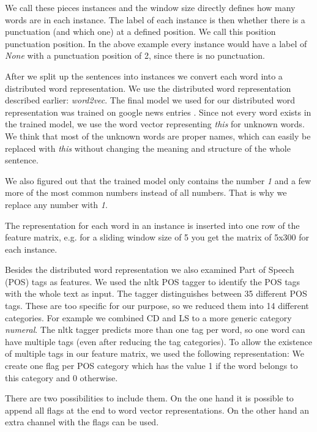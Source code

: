 We call these pieces instances and the window size directly defines how many words are in each instance.
The label of each instance is then whether there is a punctuation (and which one) at a defined position.
We call this position punctuation position.
In the above example every instance would have a label of \emph{None} with a punctuation position of 2, since there is no punctuation.

After we split up the sentences into instances we convert each word into a distributed word representation.
We use the distributed word representation described earlier: \emph{word2vec}. 
The final model we used for our distributed word representation was trained on google news entries .
Since not every word exists in the trained model, we use the word vector representing \emph{this} for unknown words.
We think that most of the unknown words are proper names, which can easily be replaced with \emph{this} without changing the meaning and structure of the whole sentence.

We also figured out that the trained model only contains the number \emph{1} and a few more of the most common numbers instead of all numbers. 
That is why we replace any number with \emph{1}.

The representation for each word in an instance is inserted into one row of the feature matrix, e.g. for a sliding window size of 5 you get the matrix of 5x300 for each instance.

Besides the distributed word representation we also examined Part of Speech (POS) tags as features.
We used the nltk POS tagger to identify the POS tags with the whole text as input.
The tagger distinguishes between 35 different POS tags.
These are too specific for our purpose, so we reduced them into 14 different categories.
For example we combined CD and LS to a more generic category \emph{numeral}.
The nltk tagger predicts more than one tag per word, so one word can have multiple tags (even after reducing the tag categories).
To allow the existence of multiple tags in our feature matrix, we used the following representation:
We create one flag per POS category which has the value 1 if the word belongs to this category and 0 otherwise.

There are two possibilities to include them.
On the one hand it is possible to append all flags at the end to word vector representations.
On the other hand an extra channel with the flags can be used.

